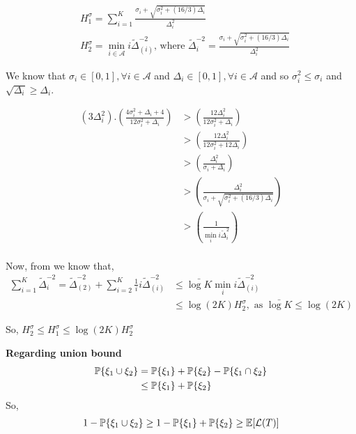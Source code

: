 \appendix
\begin{align*}
& H_{1}^{\sigma}=\sum_{i=1}^{K}\frac{\sigma_{i}+\sqrt{\sigma_{i}^{2}+(16/3)\Delta_{i}}}{\Delta_{i}^{2}}\\
& H_{2}^{\sigma}=\min_{i\in \mathcal{A}} i\tilde{\Delta}_{(i)}^{-2} \text{, where } \tilde{\Delta}_{i}^{-2}=\frac{\sigma_{i}+\sqrt{\sigma_{i}^{2}+(16/3)\Delta_{i}}}{\Delta_{i}^{2}}
\end{align*}

We know that $\sigma_{i}\in [0,1], \forall i\in \mathcal{A}$ and $\Delta_{i}\in [0,1], \forall i\in \mathcal{A}$ and so $\sigma_{i}^{2} \leq \sigma_{i}$ and $\sqrt{\Delta_{i}} \geq \Delta_{i}$.

\begin{align*}
(3\Delta_{i}^{2}).\left(\frac{4\sigma_{i}^{2}+\Delta_{i}+4}{12\sigma_{i}^{2}+\Delta_{i}}\right) & >  \left(\frac{12\Delta_{i}^{2}}{12\sigma_{i}^{2}+\Delta_{i}}\right)\\
& > \left(\frac{12\Delta_{i}^{2}}{12\sigma_{i}^{2}+12\Delta_{i}}\right)\\
& > \left(\frac{\Delta_{i}^{2}}{\sigma_{i}+\Delta_{i}}\right)\\
& > \left(\frac{\Delta_{i}^{2}}{\sigma_{i}+\sqrt{\sigma_{i}^{2} + (16/3)\Delta_{i}}}\right)\\
& > \left(\frac{1}{\min_{i}i\tilde{\Delta}_{i}^{2}}\right)\\
\end{align*}

Now, from \cite{audibert2010best} we know that,
\begin{align*}
\sum_{i=1}^{K}\tilde{\Delta}_{i}^{-2} = \tilde{\Delta}_{(2)}^{-2} + \sum_{i=2}^{K}\frac{1}{i}i\tilde{\Delta}_{(i)}^{-2} &\leq \bar{\log K}\min_{i}i\tilde{\Delta}_{(i)}^{-2}\\
& \leq \log(2K) H_{2}^{\sigma}, \text{ as $\bar{\log K} \leq \log(2K)$}
\end{align*}

So, $H_{2}^{\sigma} \leq H_{1}^{\sigma} \leq \log(2K) H_{2}^{\sigma}$

\textbf{Regarding union bound}\\
\begin{align*}
\mathbb{P}\lbrace\xi_1 \cup \xi_2\rbrace &= \mathbb{P}\lbrace\xi_1\rbrace + \mathbb{P}\lbrace\xi_2\rbrace - \mathbb{P}\lbrace\xi_1 \cap \xi_2\rbrace\\
 &\leq \mathbb{P}\lbrace\xi_1\rbrace + \mathbb{P}\lbrace\xi_2\rbrace
\end{align*}
So,
\begin{align*}
1-\mathbb{P}\lbrace\xi_1 \cup \xi_2\rbrace \geq 1-\mathbb{P}\lbrace\xi_1\rbrace + \mathbb{P}\lbrace\xi_2\rbrace \geq \mathbb{E}[\mathcal{L}(T)] \end{align*}

